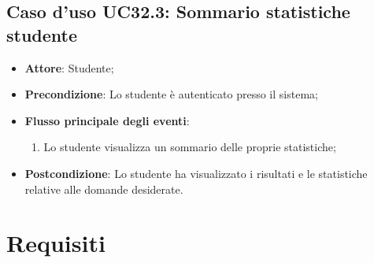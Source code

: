 \documentclass[12pt,a4paper]{article}
\begin{document}
\subsection{Caso d'uso UC32.3: Sommario statistiche studente}

\begin{itemize}

\item \textbf{Attore}: Studente; 
\item \textbf{Precondizione}: Lo studente è autenticato presso il sistema;

\item \textbf{Flusso principale degli eventi}:
\begin{enumerate}
	\item Lo studente visualizza un sommario delle proprie statistiche;
	
\end{enumerate}
\item \textbf{Postcondizione}: Lo studente ha visualizzato i risultati e le statistiche relative alle domande desiderate.
\end{itemize}

\newpage
\section{Requisiti}
\end{document}
